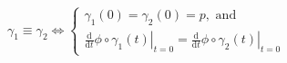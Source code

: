 \documentclass[12pt]{article}
\begin{document}
${ \displaystyle
   \gamma_1\equiv \gamma_2 \iff \left\{ \begin{array}{l} \gamma_1(0)=\gamma_2(0)=p, \text{ and }\\ [1.0ex]
   \left.\frac{\mathrm{d}}{\mathrm{d}t}\phi\circ\gamma_1(t)\right|_{t=0} = \left.\frac{\mathrm{d}}{\mathrm{d}t}\phi\circ\gamma_2(t)\right|_{t=0}
   \end{array} \right.
}$
\end{document}
